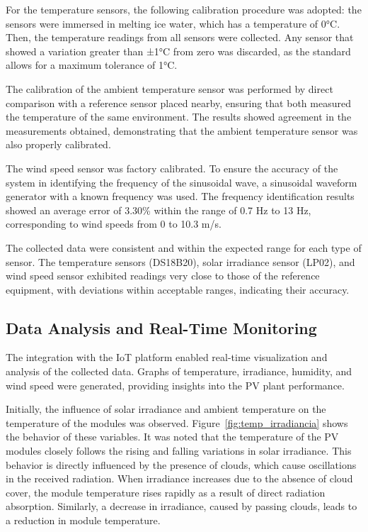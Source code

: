 For the temperature sensors, the following calibration procedure was adopted: the sensors were immersed in melting ice water, which has a temperature of 0°C. Then, the temperature readings from all sensors were collected. Any sensor that showed a variation greater than ±1°C from zero was discarded, as the standard allows for a maximum tolerance of 1°C.

The calibration of the ambient temperature sensor was performed by direct comparison with a reference sensor placed nearby, ensuring that both measured the temperature of the same environment. The results showed agreement in the measurements obtained, demonstrating that the ambient temperature sensor was also properly calibrated.


The wind speed sensor was factory calibrated. To ensure the accuracy of the system in identifying the frequency of the sinusoidal wave, a sinusoidal waveform generator with a known frequency was used. The frequency identification results showed an average error of 3.30\% within the range of 0.7 Hz to 13 Hz, corresponding to wind speeds from 0 to 10.3 m/s.


The collected data were consistent and within the expected range for each type of sensor. The temperature sensors (DS18B20), solar irradiance sensor (LP02), and wind speed sensor exhibited readings very close to those of the reference equipment, with deviations within acceptable ranges, indicating their accuracy.

\subsection{Data Analysis and Real-Time Monitoring}

The integration with the IoT platform enabled real-time visualization and analysis of the collected data. Graphs of temperature, irradiance, humidity, and wind speed were generated, providing insights into the PV plant performance.


Initially, the influence of solar irradiance and ambient temperature on the temperature of the modules was observed. Figure~\ref{fig:temp_irradiancia} shows the behavior of these variables. It was noted that the temperature of the PV modules closely follows the rising and falling variations in solar irradiance. This behavior is directly influenced by the presence of clouds, which cause oscillations in the received radiation. When irradiance increases due to the absence of cloud cover, the module temperature rises rapidly as a result of direct radiation absorption. Similarly, a decrease in irradiance, caused by passing clouds, leads to a reduction in module temperature.

